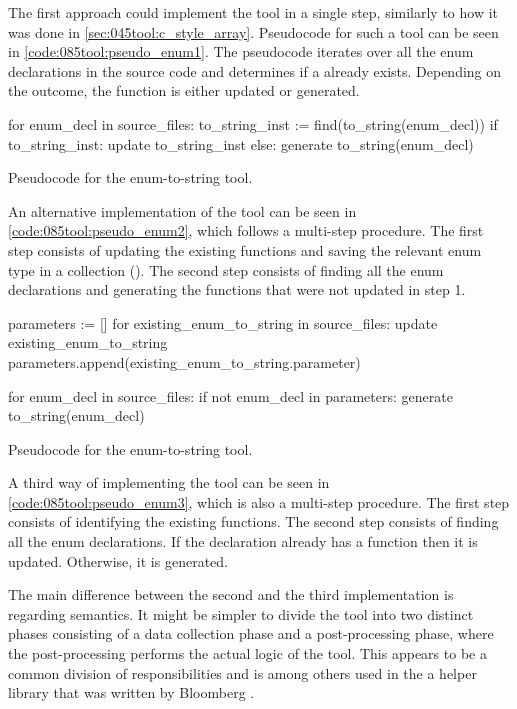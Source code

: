 The first approach could implement the tool in a single step, similarly to how it was done in \cref{sec:045tool:c_style_array}. Pseudocode for such a tool can be seen in \cref{code:085tool:pseudo_enum1}. The pseudocode iterates over all the enum declarations in the source code and determines if a  already exists. Depending on the outcome, the function is either updated or generated.

\begin{listing}[H]
    \begin{pythoncode}
for enum_decl in source_files:
    to_string_inst := find(to_string(enum_decl))
    if to_string_inst:
        update to_string_inst
    else:
        generate to_string(enum_decl)
    \end{pythoncode}
    \caption{Pseudocode for the enum-to-string tool.}
    \label{code:085tool:pseudo_enum1}
\end{listing}

An alternative implementation of the tool can be seen in \cref{code:085tool:pseudo_enum2}, which follows a multi-step procedure. The first step consists of updating the existing  functions and saving the relevant enum type in a collection (). The second step consists of finding all the enum declarations and generating the  functions that were not updated in step 1.

\begin{listing}[H]
    \begin{pythoncode}
parameters := []
for existing_enum_to_string in source_files:
    update existing_enum_to_string
    parameters.append(existing_enum_to_string.parameter)

for enum_decl in source_files:
    if not enum_decl in parameters:
        generate to_string(enum_decl)
    \end{pythoncode}
    \caption{Pseudocode for the enum-to-string tool.}
    \label{code:085tool:pseudo_enum2}
\end{listing}

A third way of implementing the tool can be seen in \cref{code:085tool:pseudo_enum3}, which is also a multi-step procedure. The first step consists of identifying the existing  functions. The second step consists of finding all the enum declarations. If the declaration already has a  function then it is updated. Otherwise, it is generated.

The main difference between the second and the third implementation is regarding semantics. It might be simpler to divide the tool into two distinct phases consisting of a data collection phase and a post-processing phase, where the post-processing performs the actual logic of the tool. This appears to be a common division of responsibilities and is among others used in the a helper library that was written by Bloomberg \cite{ClangmetatoolFrameworkReusing2023}.


